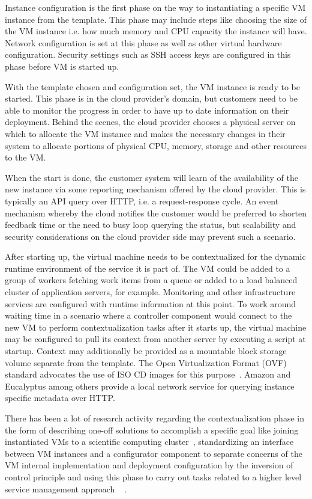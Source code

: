 \documentclass[english]{tktltiki2}
\theoremstyle{definition}
\theoremstyle{remark}
\begin{document}
Instance configuration is the first phase on the way to instantiating a specific
VM instance from the template. This phase may include steps like choosing the
size of the VM instance i.e. how much memory and CPU capacity the instance will
have. Network configuration is set at this phase as well as other virtual
hardware configuration. Security settings such as SSH access keys are configured
in this phase before VM is started up.

With the template chosen and configuration set, the VM instance is ready to be
started. This phase is in the cloud provider’s domain, but customers need to be
able to monitor the progress in order to have up to date information on their
deployment. Behind the scenes, the cloud provider chooses a physical server on
which to allocate the VM instance and makes the necessary changes in their
system to allocate portions of physical CPU, memory, storage and other resources
to the VM.

When the start is done, the customer system will learn of the availability of
the new instance via some reporting mechanism offered by the cloud provider.
This is typically an API query over HTTP, i.e. a request-response cycle. An
event mechanism whereby the cloud notifies the customer would be preferred to
shorten feedback time or the need to busy loop querying the status, but
scalability and security considerations on the cloud provider side may prevent
such a scenario.

After starting up, the virtual machine needs to be contextualized for the
dynamic runtime environment of the service it is part of. The VM could be added
to a group of workers fetching work items from a queue or added to a load
balanced cluster of application servers, for example. Monitoring and other
infrastructure services are configured with runtime information at this point.
To work around waiting time in a scenario where a controller component would
connect to the new VM to perform contextualization tasks after it starts up, the
virtual machine may be configured to pull its context from another server by
executing a script at startup. Context may additionally be provided as a
mountable block storage volume separate from the template. The Open
Virtualization Format (OVF) standard advocates the use of ISO CD images for this
purpose~\cite{ovf11}. Amazon and Eucalyptus among others provide a local network
service for querying instance specific metadata over HTTP.

There has been a lot of research activity regarding the contextualization phase
in the form of describing one-off solutions to accomplish a specific goal like
joining instantiated VMs to a scientific computing
cluster~\cite{Kijsiponge2010}, standardizing an interface between VM instances
and a configurator component to separate concerns of the VM internal
implementation and deployment configuration by the inversion of control
principle \cite{Liu2011} and using this phase to carry out tasks related to a
higher level service management approach ~\cite{frominfratoservice}
\cite{Kirschnick2010} \cite{Chapman2010}.
\end{document}
